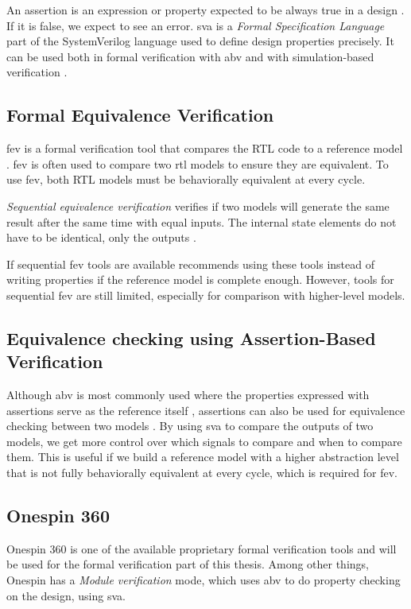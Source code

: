 An assertion is an expression or property expected to be always true in a design \cite{mehtaSystemVerilogAssertions2020}. If it is false, we expect to see an error. 
\acrfull{sva} is a \textit{Formal Specification Language} part of the SystemVerilog language used to define design properties precisely. It can be used both in formal verification with \acrfull{abv} and with simulation-based verification \cite{cernySVAPowerAssertions2015}.

\subsection{Formal Equivalence Verification}

\acrfull{fev} is a formal verification tool that compares the RTL code to a reference model \cite{seligmanFormalVerificationEssential2015}. \acrshort{fev} is often used to compare two \acrshort{rtl} models to ensure they are equivalent. To use \acrshort{fev}, both RTL models must be behaviorally equivalent at every cycle.

\textit{Sequential equivalence verification} verifies if two models will generate the same result after the same time with equal inputs. The internal state elements do not have to be identical, only the outputs \cite{seligmanFormalVerificationEssential2015}.

If sequential \acrshort{fev} tools are available \textcite{seligmanFormalVerificationEssential2015} recommends using these tools instead of writing properties if the reference model is complete enough. However, tools for sequential \acrshort{fev} are still limited, especially for comparison with higher-level models.

\subsection{Equivalence checking using Assertion-Based Verification}
\label{sec:bg_eq_abv}

Although \acrshort{abv} is most commonly used where the properties expressed with assertions serve as the reference itself \cite{seligmanFormalVerificationEssential2015}, assertions can also be used for equivalence checking between two models \cite{kumarEquivalenceCheckingUsing2015}. By using \acrshort{sva} to compare the outputs of two models, we get more control over which signals to compare and when to compare them. This is useful if we build a reference model with a higher abstraction level that is not fully behaviorally equivalent at every cycle, which is required for \acrshort{fev}.


\subsection{Onespin 360}

Onespin 360 \cite{onespinsolutionsgmbhUserManualOneSpin} is one of the available proprietary formal verification tools and will be used for the formal verification part of this thesis. Among other things, Onespin has a \textit{Module verification} mode, which uses \acrshort{abv} to do property checking on the design, using \acrfull{sva}.

